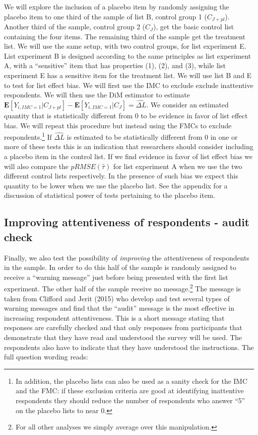 \documentclass[]{article}
\let\rmarkdownfootnote\footnote%
\def\footnote{\protect\rmarkdownfootnote}
\begin{document}
We will explore the inclusion of a placebo item by randomly assigning
the placebo item to one third of the sample of list B, control group 1
(\(C_{J+pl}\)). Another third of the sample, control group 2
(\(C_{J}\)), get the basic control list containing the four items. The
remaining third of the sample get the treatment list. We will use the
same setup, with two control groups, for list experiment E. List
experiment B is designed according to the same principles as list
experiment A, with a ``sensitive'' item that has properties (1), (2),
and (3), while list experiment E has a sensitive item for the treatment
list. We will use list B and E to test for list effect bias. We will
first use the IMC to exclude exclude inattentive respondents. We will
then use the DiM estimator to estimate
\(\mathbf{E}[Y_{i, IMC=1}|C_{J+pl}] - \mathbf{E}[Y_{i, IMC=1}|C_{J}] = \hat{\Delta L}\).
We consider an estimated quantity that is statistically different from 0
to be evidence in favor of list effect bias. We will repeat this
procedure but instead using the FMCs to exclude respondents.\footnote{In
  addition, the placebo lists can also be used as a sanity check for the
  IMC and the FMC: if these exclusion criteria are good at identifying
  inattentive respondents they should reduce the number of respondents
  who answer ``5'' on the placebo lists to near 0.} If
\(\hat{\Delta L}\) is estimated to be statistically different from 0 in
one or more of these tests this is an indication that researchers should
consider including a placebo item in the control list. If we find
evidence in favor of list effect bias we will also compare the
\(pRMSE(\hat{\tau})\) for list experiment A when we use the two
different control lists respectively. In the presence of such bias we
expect this quantity to be lower when we use the placebo list. See the
appendix for a discussion of statistical power of tests pertaining to
the placebo item.

\hypertarget{improving-attentiveness-of-respondents---audit-check}{%
\subsection{Improving attentiveness of respondents - audit
check}\label{improving-attentiveness-of-respondents---audit-check}}

Finally, we also test the possibility of \emph{improving} the
attentiveness of respondents in the sample. In order to do this half of
the sample is randomly assigned to receive a ``warning message'' just
before being presented with the first list experiment. The other half of
the sample receive no message.\footnote{For all other analyses we simply
  average over this manipulation.} The message is taken from Clifford
and Jerit (2015) who develop and test several types of warning messages
and find that the ``audit'' message is the most effective in increasing
respondent attentiveness. This is a short message stating that responses
are carefully checked and that only responses from participants that
demonstrate that they have read and understood the survey will be used.
The respondents also have to indicate that they have understood the
instructions. The full question wording reads:
\end{document}
